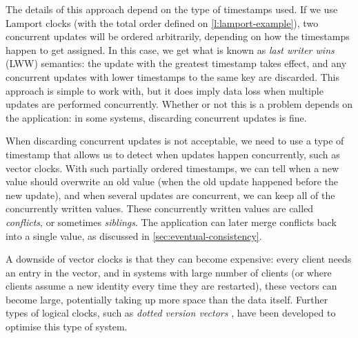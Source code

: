 \label{l:concurrent-writes}

The details of this approach depend on the type of timestamps used.
If we use Lamport clocks (with the total order defined on \autoref{l:lamport-example}), two concurrent updates will be ordered arbitrarily, depending on how the timestamps happen to get assigned.
In this case, we get what is known as \emph{last writer wins} (LWW) semantics: the update with the greatest timestamp takes effect, and any concurrent updates with lower timestamps to the same key are discarded.
This approach is simple to work with, but it does imply data loss when multiple updates are performed concurrently.
Whether or not this is a problem depends on the application: in some systems, discarding concurrent updates is fine.

When discarding concurrent updates is not acceptable, we need to use a type of timestamp that allows us to detect when updates happen concurrently, such as vector clocks.
With such partially ordered timestamps, we can tell when a new value should overwrite an old value (when the old update happened before the new update), and when several updates are concurrent, we can keep all of the concurrently written values.
These concurrently written values are called \emph{conflicts}, or sometimes \emph{siblings}.
The application can later merge conflicts back into a single value, as discussed in \autoref{sec:eventual-consistency}.

A downside of vector clocks is that they can become expensive: every client needs an entry in the vector, and in systems with large number of clients (or where clients assume a new identity every time they are restarted), these vectors can become large, potentially taking up more space than the data itself.
Further types of logical clocks, such as \emph{dotted version vectors} \citep{Preguica:2010}, have been developed to optimise this type of system.

